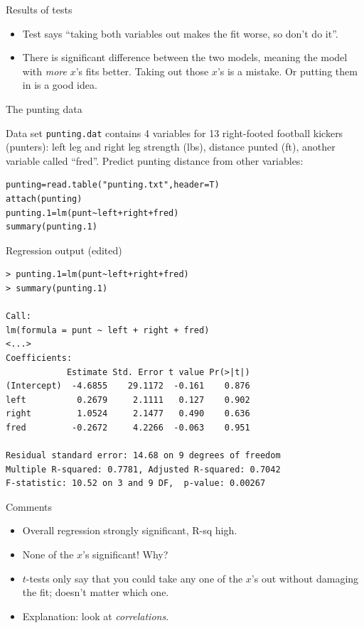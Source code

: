 \documentclass{beamer}
\begin{document}
\begin{frame}[fragile]{Results of tests}


\begin{itemize}
\item Test says ``taking both variables out makes the fit worse, so don't do it''.
\item There is significant difference between the two models, meaning
  the model with \emph{more} $x$'s fits better. Taking out those $x$'s
  is a mistake. Or putting them in is a good idea.
\end{itemize}
  
\end{frame}

\begin{frame}[fragile]{The punting data}

  Data set \verb-punting.dat- contains 4 variables for 13 right-footed
  football kickers (punters): left leg and right leg strength (lbs),
  distance punted (ft), another variable called ``fred''. Predict
  punting distance from other variables:

\begin{verbatim}
punting=read.table("punting.txt",header=T)
attach(punting)
punting.1=lm(punt~left+right+fred)
summary(punting.1)
\end{verbatim}

  
\end{frame}

\begin{frame}[fragile]{Regression output (edited)}
  
{\scriptsize
\begin{verbatim}
> punting.1=lm(punt~left+right+fred)
> summary(punting.1)

Call:
lm(formula = punt ~ left + right + fred)
<...>
Coefficients:
            Estimate Std. Error t value Pr(>|t|)
(Intercept)  -4.6855    29.1172  -0.161    0.876
left          0.2679     2.1111   0.127    0.902
right         1.0524     2.1477   0.490    0.636
fred         -0.2672     4.2266  -0.063    0.951

Residual standard error: 14.68 on 9 degrees of freedom
Multiple R-squared: 0.7781,	Adjusted R-squared: 0.7042 
F-statistic: 10.52 on 3 and 9 DF,  p-value: 0.00267 
\end{verbatim}
}

\end{frame}


\begin{frame}{Comments}

  \begin{itemize}
  \item Overall regression strongly significant, R-sq high.
  \item None of the $x$'s significant! Why?
  \item $t$-tests only say that you could take any one of the $x$'s out without damaging the fit; doesn't matter which one.
  \item Explanation: look at {\em correlations}. 
  \end{itemize}
\end{frame}
\end{document}

